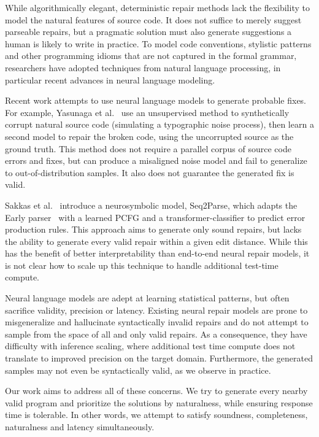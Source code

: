While algorithmically elegant, deterministic repair methods lack the flexibility to model the natural features of source code. It does not suffice to merely suggest parseable repairs, but a pragmatic solution must also generate suggestions a human is likely to write in practice. To model code conventions, stylistic patterns and other programming idioms that are not captured in the formal grammar, researchers have adopted techniques from natural language processing, in particular recent advances in neural language modeling.

Recent work attempts to use neural language models to generate probable fixes. For example, Yasunaga et al.~\cite{yasunaga2021break} use an unsupervised method to synthetically corrupt natural source code (simulating a typographic noise process), then learn a second model to repair the broken code, using the uncorrupted source as the ground truth. This method does not require a parallel corpus of source code errors and fixes, but can produce a misaligned noise model and fail to generalize to out-of-distribution samples. It also does not guarantee the generated fix is valid.

Sakkas et al.~\cite{sakkas2022seq2parse} introduce a neurosymbolic model, Seq2Parse, which adapts the Early parser~\cite{earley1970efficient} with a learned PCFG and a transformer-classifier to predict error production rules. This approach aims to generate only sound repairs, but lacks the ability to generate every valid repair within a given edit distance. While this has the benefit of better interpretability than end-to-end neural repair models, it is not clear how to scale up this technique to handle additional test-time compute.

Neural language models are adept at learning statistical patterns, but often sacrifice validity, precision or latency. Existing neural repair models are prone to misgeneralize and hallucinate syntactically invalid repairs and do not attempt to sample from the space of all and only valid repairs. As a consequence, they have difficulty with inference scaling, where additional test time compute does not translate to improved precision on the target domain. Furthermore, the generated samples may not even be syntactically valid, as we observe in practice.

Our work aims to address all of these concerns. We try to generate every nearby valid program and prioritize the solutions by naturalness, while ensuring response time is tolerable. In other words, we attempt to satisfy soundness, completeness, naturalness and latency simultaneously.
\clearpage